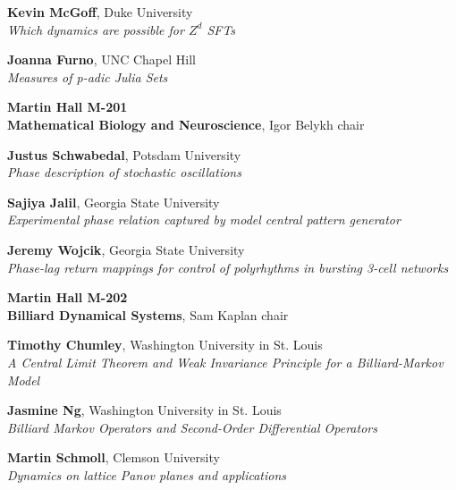 \documentclass[a4paper,10pt,foldmark,notumble]{leaflet}
\begin{document}
\hspace{-0.5cm}{\scriptsize 3:30 pm - 4:15 pm} {\bf Kevin McGoff}, Duke
University\\ {\it Which dynamics are possible for $Z^d$ SFTs}



\hspace{-0.5cm}{\scriptsize 4:30 pm - 5:15 pm} {\bf  Joanna Furno}, UNC
Chapel Hill\\
{\it Measures of p-adic Julia Sets}




\vspace{0.5cm}
{\bf Martin Hall M-201 \\
Mathematical Biology and Neuroscience}, Igor Belykh chair

\hspace{-0.5cm}{\scriptsize 2:30 pm - 3:20 pm} {\bf  Justus Schwabedal},
Potsdam University\\
{\it Phase description of stochastic oscillations}


\hspace{-0.5cm}{\scriptsize 3:30 pm - 4:15 pm} {\bf Sajiya Jalil},
Georgia State University\\ {\it Experimental phase relation captured by
model central pattern generator}

\hspace{-0.5cm}{\scriptsize 4:30 pm - 5:15 pm} {\bf Jeremy Wojcik},
Georgia State University\\
{\it Phase-lag return mappings for control of polyrhythms in bursting
3-cell networks}

\vspace{0.5cm}
{\bf Martin Hall M-202 \\
Billiard Dynamical Systems}, Sam Kaplan chair

\hspace{-0.5cm}{\scriptsize 2:30 pm - 3:20 pm} {\bf  Timothy Chumley},
Washington University in St. Louis\\{\it
A Central Limit Theorem and Weak Invariance Principle for a
Billiard-Markov Model}


\hspace{-0.5cm}{\scriptsize 3:30 pm - 4:15 pm} {\bf Jasmine Ng},
Washington University in St. Louis\\
{\it Billiard Markov Operators and Second-Order Differential Operators}

\hspace{-0.5cm}{\scriptsize 4:30 pm - 5:15 pm} {\bf Martin Schmoll},
Clemson University\\
{\it Dynamics on lattice Panov planes and applications}
\end{document}
